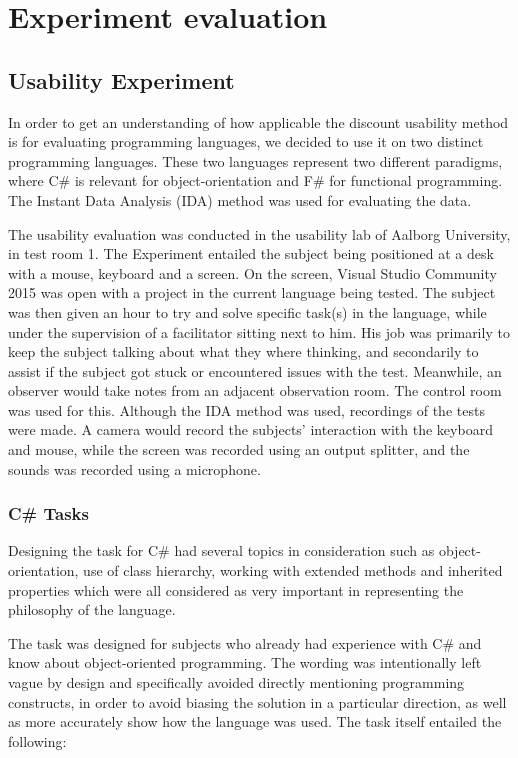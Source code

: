\chapter{Experiment evaluation}
\section{Usability Experiment}
In order to get an understanding of how applicable the discount usability method is for evaluating programming languages, we decided to use it on two distinct programming languages. These two languages represent two different paradigms, where C\# is relevant for object-orientation and F\# for functional programming. The Instant Data Analysis (IDA) method\cite{IDA} was used for evaluating the data.

The usability evaluation was conducted in the usability lab of Aalborg University\cite{UsabilityLab}, in test room 1.
The Experiment entailed the subject being positioned at a desk with a mouse, keyboard and a screen.
On the screen, Visual Studio Community 2015 was open with a project in the current language being tested.
The subject was then given an hour to try and solve specific task(s) in the language, while under the supervision of a facilitator sitting next to him. His job was primarily to keep the subject talking about what they where thinking, and secondarily to assist if the subject got stuck or encountered issues with the test.
Meanwhile, an observer would take notes from an adjacent observation room. The control room was used for this.
Although the IDA method was used, recordings of the tests were made.
A camera would record the subjects' interaction with the keyboard and mouse, while the screen was recorded using an output splitter, and the sounds was recorded using a microphone.

\subsection{C\# Tasks}

Designing the task for C\# had several topics in consideration such as object-orientation, use of class hierarchy, working with extended methods and inherited properties which were all considered as very important in representing the philosophy of the language.  

The task was designed for subjects who already had experience with C\# and know about object-oriented programming.
The wording was intentionally left vague by design and specifically avoided directly mentioning programming constructs, in order to avoid biasing the solution in a particular direction, as well as more accurately show how the language was used. The task itself entailed the following:

